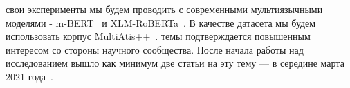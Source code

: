  свои эксперименты мы будем проводить с современными мультиязычными моделями - m-BERT~\cite{devlin-etal-2019-bert} и XLM-RoBERTa~\cite{Conneau2020UnsupervisedCR}.
В качестве датасета мы будем использовать корпус MultiAtis++~\cite{Xu2020EndtoEndSA}.
 темы подтверждается повышенным интересом со стороны научного сообщества.
После начала работы над исследованием вышло как минимум две статьи на эту тему — в середине марта 2021 года~\cite{Krishnan2021MultilingualCF,Tan2021CodeMixingOS}.

